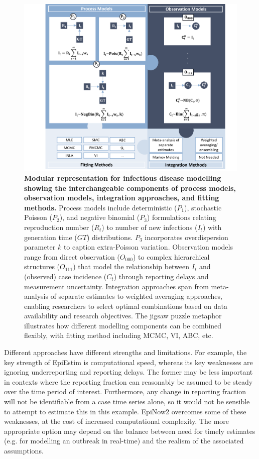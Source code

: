 \documentclass{article}
\begin{document}
\begin{figure}[htbp]
    \centering
    \includegraphics[width=\textwidth]{figures/case_study_jigsaw.png}
    \caption{\textbf{Modular representation for infectious disease modelling showing the interchangeable components of process models, observation models, integration approaches, and fitting methods.} Process models include deterministic ($P_1$), stochastic Poisson ($P_2$), and negative binomial ($P_3$) formulations relating reproduction number ($R_t$) to number of new infections ($I_t$) with generation time ($GT$) distributions. $P_3$ incorporates overdispersion parameter $k$ to caption extra-Poisson variation. Observation models range from direct observation ($O_{000}$) to complex hierarchical structures ($O_{111}$) that model the relationship between $I_t$ and (observed) case incidence ($C_t$) through reporting delays and measurement uncertainty. Integration approaches span from meta-analysis of separate estimates to weighted averaging approaches, enabling researchers to select optimal combinations based on data availability and research objectives. The jigsaw puzzle metaphor illustrates how different modelling components can be combined flexibly, with fitting method including MCMC, VI, ABC, etc.}
    \label{fig:case_study_visual}
\end{figure}



Different approaches have different strengths and limitations. For example, the key strength of EpiEstim is computational speed, whereas its key weaknesses are ignoring underreporting and reporting delays. The former may be less important in contexts where the reporting fraction can reasonably be assumed to be steady over the time period of interest. Furthermore, any change in reporting fraction will not be identifiable from a case time series alone, so it would not be sensible to attempt to estimate this in this example. EpiNow2 overcomes some of these weaknesses, at the cost of increased computational complexity. The more appropriate option may depend on the balance between need for timely estimates (e.g. for modelling an outbreak in real-time) and the realism of the associated assumptions. 
\end{document}
